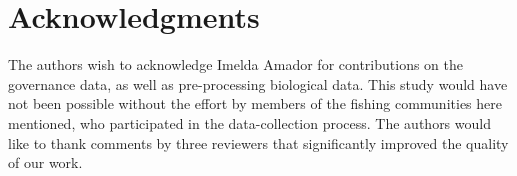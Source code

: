 \documentclass[10pt,letterpaper]{article}
\begin{document}
\section*{Acknowledgments}

The authors wish to acknowledge Imelda Amador for contributions on the governance data, as well as pre-processing biological data. This study would have not been possible without the effort by members of the fishing communities here mentioned, who participated in the data-collection process. The authors would like to thank comments by three reviewers that significantly improved the quality of our work.


\nolinenumbers

%
%
% 
\end{document}
